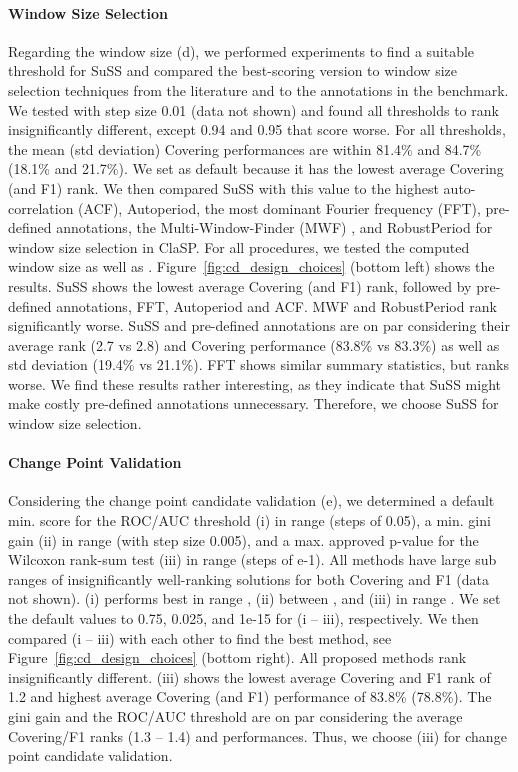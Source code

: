 \documentclass[pdflatex,sn-basic]{sn-jnl}
\begin{document}
\paragraph{Window Size Selection}
Regarding the window size (d), we performed experiments to find a suitable threshold  for SuSS and compared the best-scoring version to window size selection techniques from the literature and to the annotations in the benchmark. We tested  with step size 0.01 (data not shown) and found all thresholds to rank insignificantly different, except 0.94 and 0.95 that score worse. For all thresholds, the mean (std deviation) Covering performances are within 81.4\% and 84.7\% (18.1\% and 21.7\%). We set  as default because it has the lowest average Covering (and F1) rank. We then compared SuSS with this value to the highest auto-correlation (ACF), Autoperiod, the most dominant Fourier frequency (FFT), pre-defined annotations, the Multi-Window-Finder (MWF) \citep{ImaniMultiWindowFinderDA}, and RobustPeriod for window size selection in ClaSP. For all procedures, we tested the computed window size  as well as . Figure~\ref{fig:cd_design_choices} (bottom left) shows the results. SuSS shows the lowest average Covering (and F1) rank, followed by pre-defined annotations, FFT, Autoperiod and ACF. MWF and RobustPeriod rank significantly worse. SuSS and pre-defined annotations are on par considering their average rank (2.7 vs 2.8) and Covering performance (83.8\% vs 83.3\%) as well as std deviation (19.4\% vs 21.1\%). FFT shows similar summary statistics, but ranks worse. We find these results rather interesting, as they indicate that SuSS might make costly pre-defined annotations unnecessary. Therefore, we choose SuSS for window size selection.

\paragraph{Change Point Validation}
Considering the change point candidate validation (e), we determined a default min. score for the ROC/AUC threshold (i) in range  (steps of 0.05), a min. gini gain (ii) in range  (with step size 0.005), and a max. approved p-value for the Wilcoxon rank-sum test (iii) in range  (steps of e-1). All methods have large sub ranges of insignificantly well-ranking solutions for both Covering and F1 (data not shown). (i) performs best in range , (ii) between , and (iii) in range . We set the default values to 0.75, 0.025, and 1e-15 for (i -- iii), respectively. We then compared (i -- iii) with each other to find the best method, see Figure~\ref{fig:cd_design_choices} (bottom right). All proposed methods rank insignificantly different. (iii) shows the lowest average Covering and F1 rank of 1.2 and highest average Covering (and F1) performance of 83.8\% (78.8\%). The gini gain and the ROC/AUC threshold are on par considering the average Covering/F1 ranks (1.3 -- 1.4) and performances. Thus, we choose (iii) for change point candidate validation. 
\end{document}
